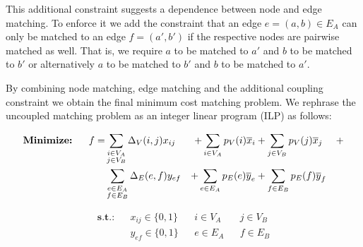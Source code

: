 		This additional constraint suggests a dependence between node and edge matching. To enforce it we add the constraint that an edge $e = (a,b) \in E_A$ can only be matched to an edge $f = (a',b')$ if the respective nodes are pairwise matched as well. That is, we require $a$ to be matched to $a'$ and $b$ to be matched to $b'$ or alternatively $a$ to be matched to $b'$ and $b$ to be matched to $a'$. 

		By combining node matching, edge matching and the additional coupling constraint we obtain the final minimum cost matching problem. We rephrase the uncoupled matching problem as an integer linear program (ILP) as follows:

		\begin{alignat}{4}
		\textbf{Minimize:} &  & \ \ f = &\sum_{ \substack{i \in V_A \\ j \in V_B }} \Delta_V(i,j) x_{ij}  &+  \sum_{ \substack{i \in V_A}} p_{V}(i) \overline{x}_{i} &+   \sum_{ \substack{j \in V_B}} p_{V}(j) \overline{x}_{j} & + \notag \\ 
		 &   & \ \     &\sum_{ \substack{e \in E_A \\ f \in E_B }} \Delta_E(e,f) y_{ef}  &+  \sum_{ \substack{e \in E_A}} p_{E}(e) \overline{y}_{e} &+   \sum_{ \substack{f \in E_B}} p_{E}(f) \overline{y}_{f} &
		\end{alignat}


		\begin{align}
		\textbf{s.t.:} 	&&x_{ij} \in \{0,1\} &&i \in V_A &&j \in V_B \\
						&&y_{ef} \in \{0,1\} &&e \in E_A &&f \in E_B                                    
		\end{align}


